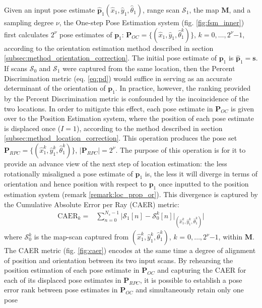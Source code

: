 Given an input pose estimate $\hat{\bm{p}}_1(\hat{x}_1, \hat{y}_1,
\hat{\theta}_1)$, range scan $\mathcal{S}_1$, the map $\bm{M}$, and a sampling
degree $\nu$, the One-step Pose Estimation system (fig. \ref{fig:fsm_inner})
first calculates $2^\nu$ pose estimates of $\bm{p}_1$: $\bm{P}_{OC} =
\{(\hat{x}_1, \hat{y}_1, \hat{\theta}_1^k)\}$, $k = 0,\dots,2^\nu$$-$$1$,
according to the orientation estimation method described in section
\ref{subsec:method_orientation_correction}. The initial pose estimate of
$\bm{p}_1$ is $\hat{\bm{p}}_1 = \bm{s}$.
If scans $\mathcal{S}_0$ and $\mathcal{S}_1$ were captured from the same
location, then the Percent Discrimination metric (eq. \ref{eq:pd}) would
suffice in serving as an accurate determinant of the orientation of $\bm{p}_1$.
In practice, however, the ranking provided by the Percent Discrimination metric
is confounded by the incoincidence of the two locations. In order to mitigate
this effect, each pose estimate in $\bm{P}_{OC}$ is given over to the Position
Estimation system, where the position of each pose estimate is displaced once
($I=1$), according to the method described in section
\ref{subsec:method_location_correction}.  This operation produces the pose set
$\bm{P}_{RPC} = \{(\hat{x}_1^k, \hat{y}_1^k, \hat{\theta}_1^k)\}$,
$|\bm{P}_{RPC}| = 2^\nu$. The purpose of this operation is for it to provide an
advance view of the next step of location estimation: the less rotationally
misaligned a pose estimate of $\bm{p}_1$ is, the less it will diverge in terms
of orientation and hence position with respect to $\bm{p}_1$ once inputted to
the position estimation system (remark \ref{remark:loc_prop_or}). This
divergence is captured by the Cumulative Absolute Error per Ray (CAER) metric:
\begin{align}
  \text{CAER}_k = & \sum\limits_{n=0}^{N_s-1} \Bigg| \mathcal{S}_1[n] - \mathcal{S}_0^k[n]\Big|_{(\hat{x}_1^k, \hat{y}_1^k, \hat{\theta}_1^k)} \Bigg|
  \label{eq:caer}
\end{align}
where $\mathcal{S}_0^k$ is the map-scan captured from
$(\hat{x}_1^k, \hat{y}_1^k, \hat{\theta}_1^k)$, $k$ = $0,\dots,2^\nu$$-$$1$,
within $\bm{M}$. The CAER metric (fig. \ref{fig:caer})
encodes at the same time a degree of alignment of position and orientation
between its two input scans. By rehearsing the position estimation of each pose
estimate in $\bm{P}_{OC}$ and capturing the CAER for each of its displaced pose
estimates in $\bm{P}_{RPC}$, it is possible to establish a pose error rank
between pose estimates in $\bm{P}_{OC}$ and simultaneously retain only one pose
